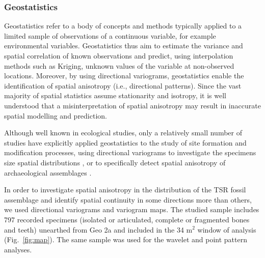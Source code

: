\documentclass[review,times,authoryear]{elsarticle} %
\begin{document}
\subsubsection{Geostatistics}

Geostatistics refer to a body of concepts and methods typically applied to a limited sample of observations of a continuous variable, for example environmental variables. Geostatistics thus aim to estimate the variance and spatial correlation of known observations and predict, using interpolation methods such as Kriging, unknown values of the variable at non-observed locations. Moreover, by using directional variograms, geostatistics enable the identification of spatial anisotropy (i.e., directional patterns). Since the vast majority of spatial statistics assume stationarity and isotropy, it is well understood that a misinterpretation of spatial anisotropy may result in inaccurate spatial modelling and prediction.

Although well known in ecological studies, only a relatively small number of studies have explicitly applied geostatistics to the study of site formation and modification processes, using directional variograms to investigate the specimens size spatial distributions \citep{Dominguez-Rodrigo2014b,Dominguez-Rodrigo2014c}, or to specifically detect spatial anisotropy of archaeological assemblages \citep{Bevan2009,Markofsky2012}.

In order to investigate spatial anisotropy in the distribution of the TSR fossil assemblage and identify spatial continuity in some directions more than others, we used directional variograms and variogram maps. The studied sample includes 797 recorded specimens (isolated or articulated, complete or fragmented bones and teeth) unearthed from Geo 2a and included in the 34 m$^2$ window of analysis (Fig.~\ref{fig:map}). The same sample was used for the wavelet and point pattern analyses.
\end{document}
